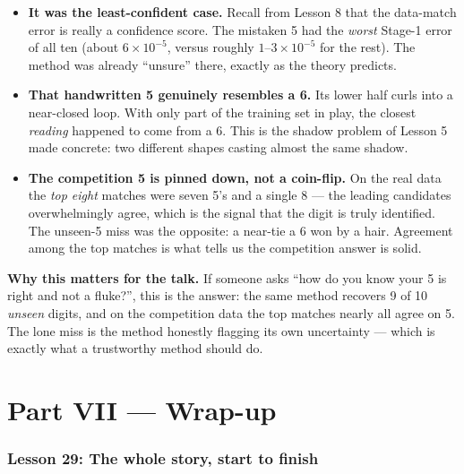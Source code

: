\documentclass[11pt]{article}
\begin{document}
\begin{itemize}[leftmargin=2em]
\item \textbf{It was the least-confident case.} Recall from Lesson 8 that the
data-match error is really a confidence score. The mistaken 5 had the
\emph{worst} Stage-1 error of all ten (about $6\times10^{-5}$, versus roughly
$1$--$3\times10^{-5}$ for the rest). The method was already ``unsure'' there,
exactly as the theory predicts.
\item \textbf{That handwritten 5 genuinely resembles a 6.} Its lower half curls
into a near-closed loop. With only part of the training set in play, the closest
\emph{reading} happened to come from a 6. This is the shadow problem of Lesson 5
made concrete: two different shapes casting almost the same shadow.
\item \textbf{The competition 5 is pinned down, not a coin-flip.} On the real
data the \emph{top eight} matches were seven 5's and a single 8 --- the leading
candidates overwhelmingly agree, which is the signal that the digit is truly
identified. The unseen-5 miss was the opposite: a near-tie a 6 won by a hair.
Agreement among the top matches is what tells us the competition answer is solid.
\end{itemize}

\begin{intuition}
\textbf{Why this matters for the talk.} If someone asks ``how do you know your 5
is right and not a fluke?'', this is the answer: the same method recovers 9 of 10
\emph{unseen} digits, and on the competition data the top matches nearly all
agree on 5. The lone miss is the method honestly flagging its own uncertainty
--- which is exactly what a trustworthy method should do.
\end{intuition}

\part*{Part VII --- Wrap-up}

\section{Lesson 29: The whole story, start to finish}
\end{document}
